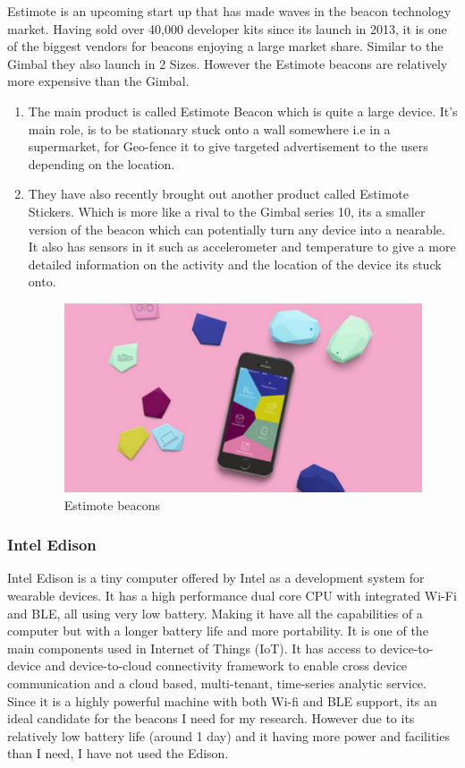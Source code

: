 Estimote\cite{estimote} is an upcoming start up that has made waves
in the beacon technology market. Having sold over 40,000 developer
kits since its launch in 2013, it is one of the biggest vendors for
beacons enjoying a large market share. Similar to the Gimbal they
also launch in 2 Sizes. However the Estimote beacons are relatively
more expensive than the Gimbal.
\begin{enumerate}
\item The main product is called Estimote Beacon which is quite a large
device. It's main role, is to be stationary stuck onto a wall somewhere
i.e in a supermarket, for Geo-fence it to give targeted advertisement
to the users depending on the location.  
\item They have also recently brought out another product called Estimote
Stickers. Which is more like a rival to the Gimbal series 10, its
a smaller version of the beacon which can potentially turn any device
into a nearable. It also has sensors in it such as accelerometer and
temperature to give a more detailed information on the activity and
the location of the device its stuck onto.
\begin{figure}[H]
\includegraphics[scale=0.3]{images/estimote}

\protect\caption{Estimote beacons}


\end{figure}

\end{enumerate}

\subsubsection{Intel Edison}

Intel Edison\cite{intel-edision} is a tiny computer offered by Intel
as a development system for wearable devices. It has a high performance
dual core CPU with integrated Wi-Fi and BLE, all using very low battery.
Making it have all the capabilities of a computer but with a longer battery
life and more portability. It is one of the main components used in
Internet of Things (IoT). It has access to device-to-device and device-to-cloud
connectivity framework to enable cross device communication and a
cloud based, multi-tenant, time-series analytic service\cite{intel-edison}. Since it
is a highly powerful machine with both Wi-fi and BLE support, its
an ideal candidate for the beacons I need for my research. However
due to its relatively low battery life (around 1 day) and it having
more power and facilities than I need, I have not used the Edison.


